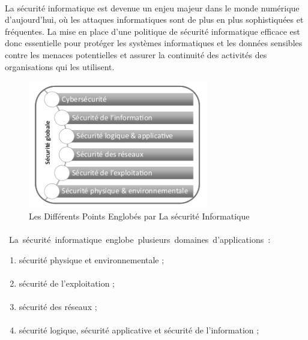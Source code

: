 \paragraph{ }  La sécurité informatique est devenue un enjeu majeur dans le monde numérique d’aujourd’hui, où les attaques informatiques sont de plus en plus sophistiquées et fréquentes. La mise en place d'une politique de sécurité informatique efficace est donc essentielle pour protéger les systèmes informatiques et les données sensibles contre les menaces potentielles et assurer la continuité des activités des organisations qui les utilisent.

\pagebreak
\begin{figure}[h]
 


\hbox{\includegraphics[width=0.7\textwidth]{PhotoMemoire/image_sec.png}}
\caption{Les Différents Points Englobés par La sécurité Informatique}
\end{figure}
\paragraph{ }
\hbox{ La sécurité informatique englobe plusieurs domaines d'applications :}
\vspace{5mm}
\begin{enumerate}
 

 \item \space   sécurité physique et environnementale ;
\paragraph{ }
 \item  \space   sécurité de l’exploitation ;
\paragraph{ }
\item   \space  sécurité des réseaux ;
\paragraph{ }
\item   \space  sécurité logique, sécurité applicative et sécurité de l’information ;
\end{enumerate}
 
